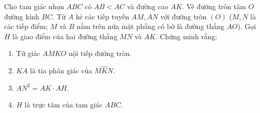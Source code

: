 \begin{bt}%
Cho tam giác nhọn $ABC$ có $AB < AC$ và đường cao $AK$. Vẽ đường tròn tâm $O$ đường kính $BC$. Từ $A$ kẻ các tiếp tuyến $AM, AN$ với đường tròn $(O)$ ($M, N$ là các tiếp điểm; $M$ và $B$ nằm trên nửa mặt phẳng có bờ là đường thẳng $AO$). Gọi $H$ là giao điểm của hai đường thẳng $MN$ và $AK$. Chứng minh rằng:
\begin{enumerate}
	\item Tứ giác $AMKO$ nội tiếp đường tròn.
	\item $KA$ là tia phân giác của $\widehat{MKN}$.
	\item $AN^2 = AK \cdot AH$.
	\item $H$ là trực tâm của tam giác $ABC$.
\end{enumerate}
\end{bt}
